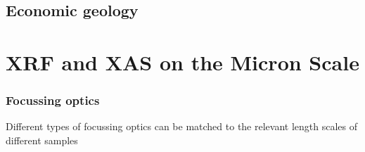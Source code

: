 \documentclass[10pt, xcolor=x11names, compress]{beamer}
\begin{document}
\subsection[Economic geology]{Economic geology}





\section[Microprobe]{XRF and XAS on the Micron Scale}


\begin{frame}
  \frametitle{Focussing optics}

  Different types of focussing optics can be matched to the relevant
  length scales of different samples


\end{frame}
\end{document}
